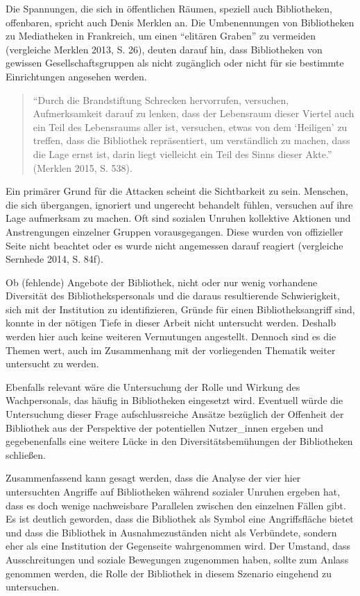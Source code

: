 \documentclass[a4paper,
fontsize=11pt,
oneside,
numbers=noperiodatend,
parskip=half-,
bibliography=totoc,
final
]{scrartcl}
\begin{document}
Die Spannungen, die sich in öffentlichen Räumen, speziell auch
Bibliotheken, offenbaren, spricht auch Denis Merklen an. Die
Umbenennungen von Bibliotheken zu Mediatheken in Frankreich, um einen
\enquote{elitären Graben} zu vermeiden (vergleiche Merklen 2013, S. 26),
deuten darauf hin, dass Bibliotheken von gewissen Gesellschaftsgruppen
als nicht zugänglich oder nicht für sie bestimmte Einrichtungen
angesehen werden.

\begin{quote}
\enquote{Durch die Brandstiftung Schrecken hervorrufen, versuchen,
Aufmerksamkeit darauf zu lenken, dass der Lebensraum dieser Viertel auch
ein Teil des Lebensraums aller ist, versuchen, etwas von dem
\enquote{Heiligen} zu treffen, dass die Bibliothek repräsentiert, um
verständlich zu machen, dass die Lage ernst ist, darin liegt vielleicht
ein Teil des Sinns dieser Akte.} (Merklen 2015, S. 538).
\end{quote}

Ein primärer Grund für die Attacken scheint die Sichtbarkeit zu sein.
Menschen, die sich übergangen, ignoriert und ungerecht behandelt fühlen,
versuchen auf ihre Lage aufmerksam zu machen. Oft sind sozialen Unruhen
kollektive Aktionen und Anstrengungen einzelner Gruppen vorausgegangen.
Diese wurden von offizieller Seite nicht beachtet oder es wurde nicht
angemessen darauf reagiert (vergleiche Sernhede 2014, S. 84f).

Ob (fehlende) Angebote der Bibliothek, nicht oder nur wenig vorhandene
Diversität des Bibliothekspersonals und die daraus resultierende
Schwierigkeit, sich mit der Institution zu identifizieren, Gründe für
einen Bibliotheksangriff sind, konnte in der nötigen Tiefe in dieser
Arbeit nicht untersucht werden. Deshalb werden hier auch keine weiteren
Vermutungen angestellt. Dennoch sind es die Themen wert, auch im
Zusammenhang mit der vorliegenden Thematik weiter untersucht zu werden.

Ebenfalls relevant wäre die Untersuchung der Rolle und Wirkung des
Wachpersonals, das häufig in Bibliotheken eingesetzt wird. Eventuell
würde die Untersuchung dieser Frage aufschlussreiche Ansätze bezüglich
der Offenheit der Bibliothek aus der Perspektive der potentiellen
Nutzer\_innen ergeben und gegebenenfalls eine weitere Lücke in den
Diversitätsbemühungen der Bibliotheken schließen.

Zusammenfassend kann gesagt werden, dass die Analyse der vier hier
untersuchten Angriffe auf Bibliotheken während sozialer Unruhen ergeben
hat, dass es doch wenige nachweisbare Parallelen zwischen den einzelnen
Fällen gibt. Es ist deutlich geworden, dass die Bibliothek als Symbol
eine Angriffsfläche bietet und dass die Bibliothek in Ausnahmezuständen
nicht als Verbündete, sondern eher als eine Institution der Gegenseite
wahrgenommen wird. Der Umstand, dass Ausschreitungen und soziale
Bewegungen zugenommen haben, sollte zum Anlass genommen werden, die
Rolle der Bibliothek in diesem Szenario eingehend zu untersuchen.
\end{document}
